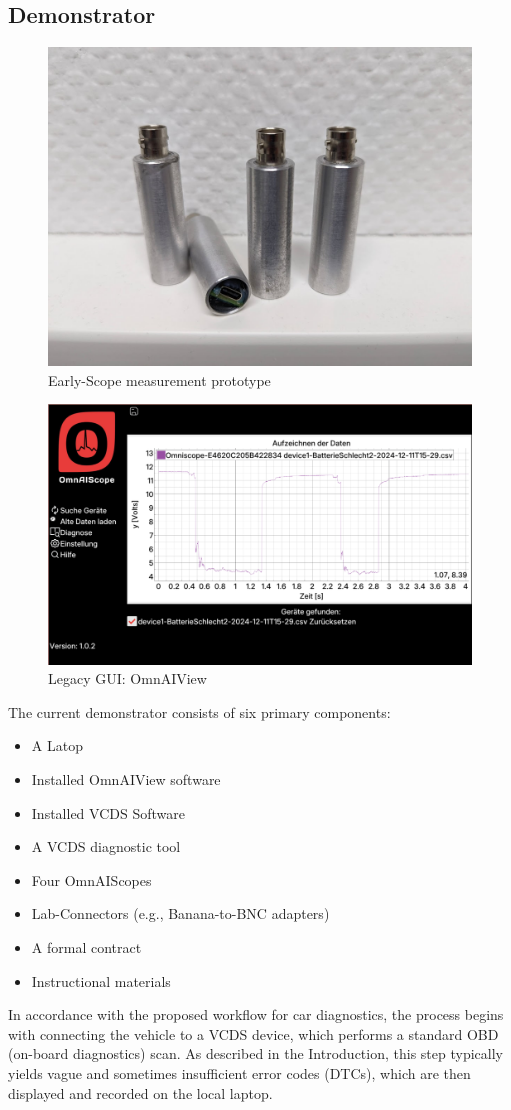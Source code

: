 \subsection{Demonstrator}
\begin{figure}[ht]
  \centering
  \includegraphics[width=0.8\linewidth]{figures/early_prototype.jpg}
  \caption{Early-Scope measurement prototype}
  \label{fig:early-scope}
\end{figure}

\begin{figure}[ht]
  \centering
  \includegraphics[width=0.8\linewidth]{figures/legacy_gui.png}
  \caption{Legacy GUI: OmnAIView}
  \label{fig:gui}
\end{figure}

The current demonstrator consists of six primary components:
\begin{itemize}
  \item A Latop
  \item Installed OmnAIView software
  \item Installed VCDS Software
  \item A VCDS diagnostic tool
  \item Four OmnAIScopes
  \item Lab-Connectors (e.g., Banana-to-BNC adapters)
  \item A formal contract
  \item Instructional materials
\end{itemize}
In accordance with the proposed workflow for car diagnostics, the process begins with connecting the vehicle to a VCDS device, which performs a standard OBD (on-board diagnostics) scan. 
As described in the Introduction, this step typically yields vague and sometimes insufficient error codes (DTCs), which are then displayed and recorded on the local laptop.

